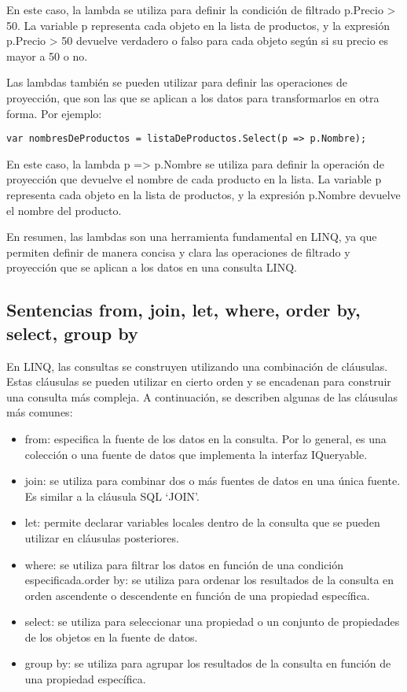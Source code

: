 \documentclass[executivepaper]{article}
\begin{document}
En este caso, la lambda se utiliza para definir la condición de filtrado p.Precio > 50. La variable p representa cada objeto en la lista de productos, y la expresión p.Precio > 50 devuelve verdadero o falso para cada objeto según si su precio es mayor a 50 o no.

Las lambdas también se pueden utilizar para definir las operaciones de proyección, que son las que se aplican a los datos para transformarlos en otra forma. Por ejemplo:

\begin{lstlisting}
var nombresDeProductos = listaDeProductos.Select(p => p.Nombre);
\end{lstlisting}

En este caso, la lambda p => p.Nombre se utiliza para definir la operación de proyección que devuelve el nombre de cada producto en la lista. La variable p representa cada objeto en la lista de productos, y la expresión p.Nombre devuelve el nombre del producto.

En resumen, las lambdas son una herramienta fundamental en LINQ, ya que permiten definir de manera concisa y clara las operaciones de filtrado y proyección que se aplican a los datos en una consulta LINQ.

\subsection{Sentencias from, join, let, where, order by, select, group by}

En LINQ, las consultas se construyen utilizando una combinación de cláusulas. Estas cláusulas se pueden utilizar en cierto orden y se encadenan para construir una consulta más compleja. A continuación, se describen algunas de las cláusulas más comunes:

\begin{itemize}
    \item from: especifica la fuente de los datos en la consulta. Por lo general, es una colección o una fuente de datos que implementa la interfaz IQueryable.
    \item join: se utiliza para combinar dos o más fuentes de datos en una única fuente. Es similar a la cláusula SQL \enquote*{JOIN}.
    \item let: permite declarar variables locales dentro de la consulta que se pueden utilizar en cláusulas posteriores.
    \item where: se utiliza para filtrar los datos en función de una condición especificada.order by: se utiliza para ordenar los resultados de la consulta en orden ascendente o descendente en función de una propiedad específica.
    \item select: se utiliza para seleccionar una propiedad o un conjunto de propiedades de los objetos en la fuente de datos.
    \item group by: se utiliza para agrupar los resultados de la consulta en función de una propiedad específica.
\end{itemize}
\end{document}
